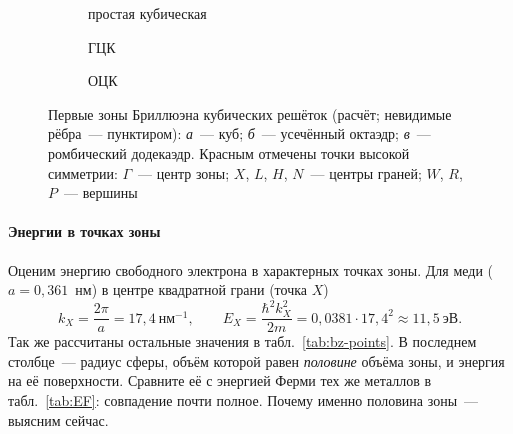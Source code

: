 \begin{figure}[ht]
\centering
\begin{subfigure}[b]{0.3\textwidth}\centering
{}
\caption{простая кубическая}
\end{subfigure}\hfill
\begin{subfigure}[b]{0.32\textwidth}\centering
{}
\caption{ГЦК}
\end{subfigure}\hfill
\begin{subfigure}[b]{0.32\textwidth}\centering
{}
\caption{ОЦК}
\end{subfigure}
\caption{Первые зоны Бриллюэна кубических решёток (расчёт; невидимые рёбра~—
пунктиром): \textit{а}~— куб; \textit{б}~— усечённый октаэдр;
\textit{в}~— ромбический додекаэдр. Красным отмечены точки высокой
симметрии: $\Gamma$~— центр зоны; $X$, $L$, $H$, $N$~— центры граней;
$W$, $R$, $P$~— вершины}
\label{fig:bz-3d}
\end{figure}

\paragraph{Энергии в точках зоны}
Оценим энергию свободного электрона в характерных точках зоны. Для меди
($a=0{,}361$~нм) в центре квадратной грани (точка $X$)
\[
k_X=\frac{2\pi}a=17{,}4~\text{нм}^{-1},\qquad
E_X=\frac{\hbar^2k_X^2}{2m}=0{,}0381\cdot17{,}4^2\approx11{,}5~\text{эВ}.
\]
Так же рассчитаны остальные значения в табл.~\ref{tab:bz-points}. В
последнем столбце~— радиус сферы, объём которой равен \emph{половине}
объёма зоны, и энергия на её поверхности. Сравните её с энергией Ферми
тех же металлов в табл.~\ref{tab:EF}: совпадение почти полное. Почему
именно половина зоны~— выясним сейчас.

